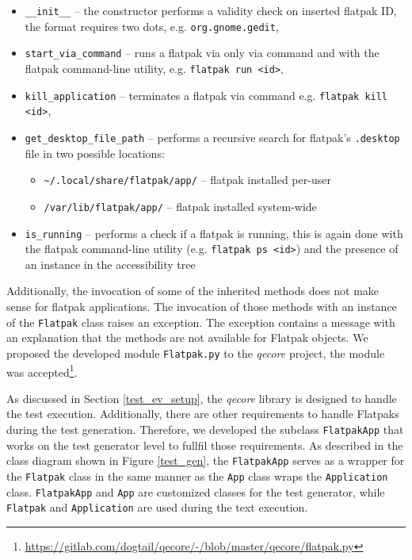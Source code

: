 \begin{itemize} 
    \item \texttt{\_\_init\_\_} -- the constructor performs a validity check on inserted flatpak ID, the format requires two dots, e.g. \texttt{org.gnome.gedit},
    \item \texttt{start\_via\_command} -- runs a flatpak via only via command and with the flatpak command-line utility, e.g. \texttt{flatpak run <id>},
    \item \texttt{kill\_application} -- terminates a flatpak via command e.g. \texttt{flatpak kill <id>},
    \item \texttt{get\_desktop\_file\_path} -- performs a recursive search for flatpak's \texttt{.desktop} file in two possible locations:
    \begin{itemize}
        \item \texttt{\textasciitilde/.local/share/flatpak/app/} -- flatpak installed per-user
        \item \texttt{/var/lib/flatpak/app/} -- flatpak installed system-wide
    \end{itemize} 
    \item \texttt{is\_running} -- performs a check if a flatpak is running, this is again done with the flatpak command-line utility (e.g. \texttt{flatpak ps <id>}) and the presence of an instance in the accessibility tree
\end{itemize}

Additionally, the invocation of some of the inherited methods does not make sense for flatpak applications. The invocation of those methods with an instance of the \texttt{Flatpak} class raises an exception. The exception contains a message with an explanation that the methods are not available for Flatpak objects. We proposed the developed module \texttt{Flatpak.py} to the \textit{qecore} project, the module was accepted{\footnote{\url{https://gitlab.com/dogtail/qecore/-/blob/master/qecore/flatpak.py}}}.

As discussed in Section \ref{test_ev_setup}, the \textit{qecore} library is designed to handle the test execution. Additionally, there are other requirements to handle Flatpaks during the test generation. Therefore, we developed the subclass \texttt{FlatpakApp} that works on the test generator level to fullfil those requirements. As described in the class diagram shown in Figure \ref{test_gen}, the \texttt{FlatpakApp} serves as a wrapper for the \texttt{Flatpak} class in the same manner as the \texttt{App} class wraps the \texttt{Application} class. \texttt{FlatpakApp} and \texttt{App} are customized classes for the test generator, while \texttt{Flatpak} and \texttt{Application} are used during the text execution. 


